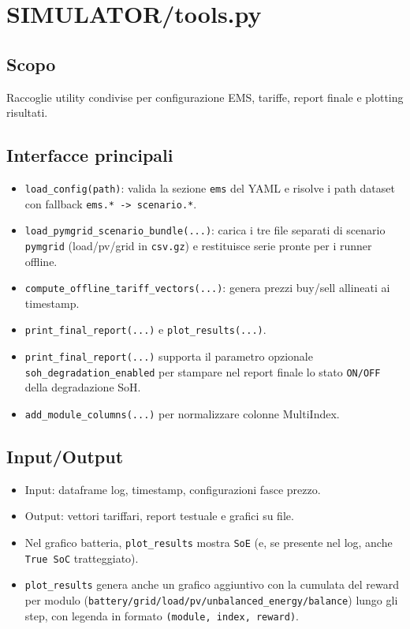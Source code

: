 \section{SIMULATOR/tools.py}

\subsection*{Scopo}
Raccoglie utility condivise per configurazione EMS, tariffe, report finale e plotting risultati.

\subsection*{Interfacce principali}
\begin{itemize}[leftmargin=1.2cm]
\item \texttt{load\_config(path)}: valida la sezione \texttt{ems} del YAML e risolve i path dataset con fallback \texttt{ems.* -> scenario.*}.
\item \texttt{load\_pymgrid\_scenario\_bundle(...)}: carica i tre file separati di scenario \texttt{pymgrid} (load/pv/grid in \texttt{csv.gz}) e restituisce serie pronte per i runner offline.
\item \texttt{compute\_offline\_tariff\_vectors(...)}: genera prezzi buy/sell allineati ai timestamp.
\item \texttt{print\_final\_report(...)} e \texttt{plot\_results(...)}.
\item \texttt{print\_final\_report(...)} supporta il parametro opzionale \texttt{soh\_degradation\_enabled} per stampare nel report finale lo stato \texttt{ON/OFF} della degradazione SoH.
\item \texttt{add\_module\_columns(...)} per normalizzare colonne MultiIndex.
\end{itemize}

\subsection*{Input/Output}
\begin{itemize}[leftmargin=1.2cm]
\item Input: dataframe log, timestamp, configurazioni fasce prezzo.
\item Output: vettori tariffari, report testuale e grafici su file.
\item Nel grafico batteria, \texttt{plot\_results} mostra \texttt{SoE} (e, se presente nel log, anche \texttt{True SoC} tratteggiato).
\item \texttt{plot\_results} genera anche un grafico aggiuntivo con la cumulata del reward per modulo (\texttt{battery/grid/load/pv/unbalanced\_energy/balance}) lungo gli step, con legenda in formato \texttt{(module, index, reward)}.
\end{itemize}

